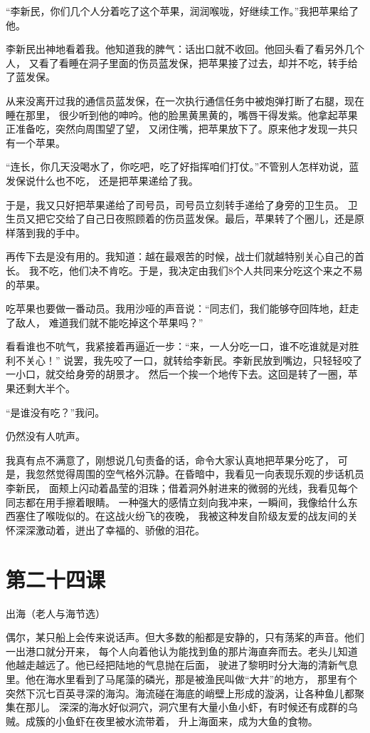 \documentclass[12pt,UTF8]{ctexbook}
\begin{document}
“李新民，你们几个人分着吃了这个苹果，润润喉咙，好继续工作。”我把苹果给了他。

李新民出神地看着我。他知道我的脾气：话出口就不收回。他回头看了看另外几个人，
又看了看睡在洞子里面的伤员蓝发保，把苹果接了过去，却并不吃，转手给了蓝发保。

从来没离开过我的通信员蓝发保，在一次执行通信任务中被炮弹打断了右腿，现在睡在那里，
很少听到他的呻吟。他的脸黑黄黑黄的，嘴唇干得发紫。他拿起苹果正准备吃，突然向周围望了望，
又闭住嘴，把苹果放下了。原来他才发现一共只有一个苹果。

“连长，你几天没喝水了，你吃吧，吃了好指挥咱们打仗。”不管别人怎样劝说，蓝发保说什么也不吃，
还是把苹果递给了我。

于是，我又只好把苹果递给了司号员，司号员立刻转手递给了身旁的卫生员。
卫生员又把它交给了自己日夜照顾着的伤员蓝发保。最后，苹果转了个圈儿，还是原样落到我的手中。

再传下去是没有用的。我知道：越在最艰苦的时候，战士们就越特别关心自己的首长。
我不吃，他们决不肯吃。于是，我决定由我们8个人共同来分吃这个来之不易的苹果。

吃苹果也要做一番动员。我用沙哑的声音说：“同志们，我们能够夺回阵地，赶走了敌人，
难道我们就不能吃掉这个苹果吗？”

看看谁也不吭气，我紧接着再逼近一步：“来，一人分吃一口，谁不吃谁就是对胜利不关心！”
说罢，我先咬了一口，就转给李新民。李新民放到嘴边，只轻轻咬了一小口，就交给身旁的胡景才。
然后一个挨一个地传下去。这回是转了一圈，苹果还剩大半个。

“是谁没有吃？”我问。

仍然没有人吭声。

我真有点不满意了，刚想说几句责备的话，命令大家认真地把苹果分吃了，
可是，我忽然觉得周围的空气格外沉静。在昏暗中，我看见一向表现乐观的步话机员李新民，
面颊上闪动着晶莹的泪珠；借着洞外射进来的微弱的光线，我看见每个同志都在用手擦着眼睛。
一种强大的感情立刻向我冲来，一瞬间，我像给什么东西塞住了喉咙似的。在这战火纷飞的夜晚，
我被这种发自阶级友爱的战友间的关怀深深激动着，迸出了幸福的、骄傲的泪花。

\section{第二十四课}

出海（老人与海节选）

偶尔，某只船上会传来说话声。但大多数的船都是安静的，只有荡桨的声音。他们一出港口就分开来，
每个人向着他认为能找到鱼的那片海直奔而去。老头儿知道他越走越远了。他已经把陆地的气息抛在后面，
驶进了黎明时分大海的清新气息里。他在海水里看到了马尾藻的磷光，那是被渔民叫做“大井”的地方，
那里有个突然下沉七百英寻深的海沟。海流碰在海底的峭壁上形成的漩涡，让各种鱼儿都聚集在那儿。
深深的海水好似洞穴，洞穴里有大量小鱼小虾，有时候还有成群的乌贼。成簇的小鱼虾在夜里被水流带着，
升上海面来，成为大鱼的食物。
\end{document}
